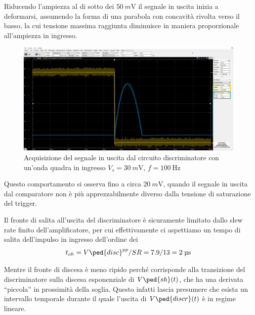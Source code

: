 \documentclass[10pt, a4paper, italian]{article}
\begin{document}
Riducendo l'ampiezza al di sotto dei $\SI{50}{m\V}$ il segnale in uscita
inizia a deformarsi, assumendo la forma di una parabola con concavità rivolta
verso il basso, la cui tensione massima raggiunta diminuisce in maniera
proporzionale all'ampiezza in ingresso.
\begin{figure}[htbp]
\centering
\includegraphics[scale=0.335]{discr_sat}
\caption{Acquisizione del segnale in uscita dal circuito discriminatore con
un'onda quadra in ingresso $V_s = \SI{30}{m\V}$, $f = \SI{100}{\Hz}$
\label{fig: discr_sat}}
\end{figure}

Questo comportamento si osserva fino a circa $\SI{20}{m\V}$, quando il segnale
in uscita dal comparatore non è più apprezzabilmente diverso dalla tensione di
saturazione del trigger.

Il fronte di salita all'uscita del discriminatore è sicuramente limitato dallo
slew rate finito dell'amplificatore, per cui effettivamente ci aspettiamo
un tempo di salita dell'impulso in ingresso dell'ordine dei
\[
t_{oh} = V\ped{disc}^{pp}/SR = 7.9 / 13 = 2 \; \si{\micro\s}
\]

Mentre il fronte di discesa è meno ripido perché corrisponde alla transizione
del discriminatore sulla discesa esponenziale di $V\ped{sh} (t)$, che ha una
derivata ``piccola'' in prossimità della soglia. Questo infatti lascia
presumere che esista un intervallo temporale durante il quale l'uscita di
$V\ped{discr} (t)$ è in regime lineare.
\end{document}
